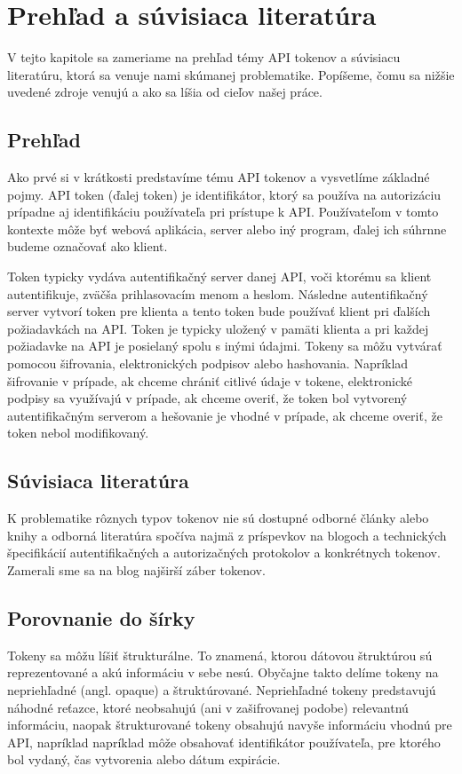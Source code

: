 \chapter{Prehľad a súvisiaca literatúra}

\label{kap:du} %

V tejto kapitole sa zameriame na prehľad témy API tokenov a súvisiacu literatúru, ktorá sa venuje nami skúmanej problematike. Popíšeme, čomu sa nižšie uvedené zdroje venujú a ako sa líšia od cieľov našej práce.

\section{Prehľad}
Ako prvé si v krátkosti predstavíme tému API tokenov a vysvetlíme základné pojmy. API token (ďalej token) je identifikátor, ktorý sa používa na autorizáciu prípadne aj identifikáciu používateľa pri prístupe k API. Používateľom v tomto kontexte môže byť webová aplikácia, server alebo iný program, ďalej ich súhrnne budeme označovať ako klient. 

Token typicky vydáva autentifikačný server danej API, voči ktorému sa klient autentifikuje, zväčša prihlasovacím menom a heslom. Následne autentifikačný server vytvorí token pre klienta a tento token bude používať klient pri ďalších požiadavkách na API. Token je typicky uložený v pamäti klienta a pri každej požiadavke na API je posielaný spolu s inými údajmi. Tokeny sa môžu vytvárať pomocou šifrovania, elektronických podpisov alebo hashovania. Napríklad šifrovanie v prípade, ak chceme chrániť citlivé údaje v tokene, elektronické podpisy sa využívajú v prípade, ak chceme overiť, že token bol vytvorený autentifikačným serverom a hešovanie je vhodné v prípade, ak chceme overiť, že token nebol modifikovaný.

\section{Súvisiaca literatúra}
K problematike rôznych typov tokenov nie sú dostupné odborné články alebo knihy a odborná literatúra spočíva najmä z príspevkov na blogoch a technických špecifikácií autentifikačných a autorizačných protokolov a konkrétnych tokenov. Zamerali sme sa na blog najširší záber tokenov.

\section{Porovnanie do šírky}
Tokeny sa môžu líšiť štrukturálne. To znamená, ktorou dátovou štruktúrou sú reprezentované a akú informáciu v sebe nesú. Obyčajne takto delíme tokeny na nepriehľadné (angl. opaque) a štruktúrované. Nepriehľadné tokeny predstavujú náhodné reťazce, ktoré neobsahujú (ani v zašifrovanej podobe) relevantnú informáciu, naopak štrukturované tokeny obsahujú navyše informáciu vhodnú pre API, napríklad napríklad môže obsahovať identifikátor používateľa, pre ktorého bol vydaný, čas vytvorenia alebo dátum expirácie.

